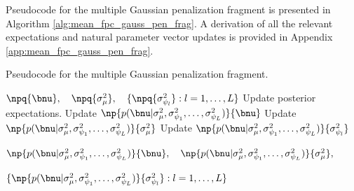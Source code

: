 \documentclass[ba]{imsart}
\numberwithin{equation}{section}
\theoremstyle{plain}
\def\sigsqmu{\sigma^2_{\mu}}
\newcommand\sigsqpsi[1]{\sigma^2_{\psi_{#1}}}
\begin{document}


Pseudocode for the multiple Gaussian penalization fragment is presented in Algorithm
\ref{alg:mean_fpc_gauss_pen_frag}.
A derivation of all the relevant expectations and natural parameter vector updates is provided in Appendix
\ref{app:mean_fpc_gauss_pen_frag}.

\begin{algorithm}
	\caption{
		Pseudocode for the multiple Gaussian penalization fragment.
	}
	\label{alg:mean_fpc_gauss_pen_frag}
	\begin{algorithmic}[1]
		\Inputs $
				\npq{\bnu}, \quad
				\npq{\sigsqmu}, \quad
				\{
					\npq{\sigsqpsi{l}}:
					l = 1, \dots, L
				\}
		$
		\Updates
			\State Update posterior expectations.
			\State Update $\np{p (\bnu | \sigsqmu, \sigsqpsi{1}, \dots, \sigsqpsi{L})}{\bnu}$
			\State Update $\np{p (\bnu | \sigsqmu, \sigsqpsi{1}, \dots, \sigsqpsi{L})}{\sigsqmu}$
				\State Update $\np{p (\bnu | \sigsqmu, \sigsqpsi{1}, \dots, \sigsqpsi{L})}{\sigsqpsi{l}}$
			\EndFor
		\Outputs
			\begin{varwidth}[t]{\linewidth} $
				\np{p (\bnu | \sigsqmu, \sigsqpsi{1}, \dots, \sigsqpsi{L})}{\bnu}, \quad
					\np{p (\bnu | \sigsqmu, \sigsqpsi{1}, \dots, \sigsqpsi{L})}{\sigsqmu},
			$\par$
				\{
					\np{p (\bnu | \sigsqmu, \sigsqpsi{1}, \dots, \sigsqpsi{L})}{\sigsqpsi{l}} :
					l = 1, \dots, L
				\}
			$ \end{varwidth}
	\end{algorithmic}
\end{algorithm}
\end{document}
